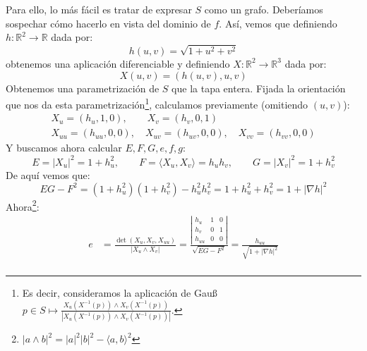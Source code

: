 \documentclass[12pt]{article}
\begin{document}
\begin{ejercicio}
\begin{enumerate}[label=\alph*)]
                Para ello, lo más fácil es tratar de expresar $S$ como un grafo. Deberíamos sospechar cómo hacerlo en vista del dominio de $f$. Así, vemos que definiendo $h:\mathbb{R}^2\to\mathbb{R}$ dada por:
                \begin{equation*}
                    h(u,v) = \sqrt{1+u^2+v^2}
                \end{equation*}
                obtenemos una aplicación diferenciable y definiendo $X:\mathbb{R}^2\to\mathbb{R}^3$ dada por:
                \begin{equation*}
                    X(u,v) = (h(u,v),u,v)
                \end{equation*}
                Obtenemos una parametrización de $S$ que la tapa entera. Fijada la orientación que nos da esta parametrización\footnote{Es decir, consideramos la aplicación de Gau\ss\ $p\in S\mapsto \frac{X_u(X^{-1}(p))\land X_v(X^{-1}(p))}{|X_u(X^{-1}(p))\land X_v(X^{-1}(p))|}$.}, calculamos previamente (omitiendo $(u,v)$):
                \begin{gather*}
                    X_u = (h_u,1,0), \qquad X_v = (h_v,0,1) \\
                    X_{uu} = (h_{uu},0,0), \quad X_{uv} = (h_{uv},0,0), \quad X_{vv} = (h_{vv},0,0)
                \end{gather*}
                Y buscamos ahora calcular $E,F,G,e,f,g$:
                \begin{equation*}
                    E = |X_u|^2 = 1 + h_u^2, \qquad F = \langle X_u,X_v \rangle  = h_uh_v, \qquad G= |X_v|^2 = 1 + h_v^2 
                \end{equation*}
                De aquí vemos que:
                \begin{equation*}
                    EG-F^2 = (1+h_u^2)(1+h_v^2) - h_u^2h_v^2 = 1 + h_u^2 + h_v^2 = 1 + |\nabla h|^2
                \end{equation*}
                Ahora\footnote{$|a\land b|^2 = |a|^2|b|^2 - \langle a,b \rangle^2$}:
                \begin{align*}
                    e &= \frac{\det(X_u,X_v,X_{uu})}{|X_u\land X_v|} = \frac{\left|\begin{array}{ccc}
                        h_u & 1 & 0 \\
                        h_v & 0 & 1 \\
                        h_{uu} & 0 & 0
                    \end{array}\right|}{\sqrt{EG-F^2}} = \frac{h_{uu}}{\sqrt{1+|\nabla h|^2}} \\

\end{align*}
\end{enumerate}
\end{ejercicio}
\end{document}
